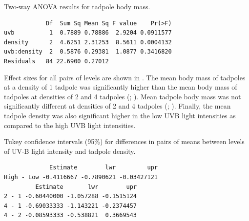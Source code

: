 \documentclass[10pt,openany]{book}\usepackage[]{graphicx}\usepackage[]{color}
\makeatletter
\newenvironment{kframe}{%
 \def\at@end@of@kframe{}%
 \ifinner\ifhmode%
  \def\at@end@of@kframe{\end{minipage}}%
  \begin{minipage}{\columnwidth}%
 \fi\fi%
 \def\FrameCommand##1{\hskip\@totalleftmargin \hskip-\fboxsep
 \colorbox{shadecolor}{##1}\hskip-\fboxsep
     \hskip-\linewidth \hskip-\@totalleftmargin \hskip\columnwidth}%
 \MakeFramed {\advance\hsize-\width
   \@totalleftmargin\z@ \linewidth\hsize
   \@setminipage}}%
 {\par\unskip\endMakeFramed%
 \at@end@of@kframe}
\newenvironment{knitrout}{}{} %
\makeatother
\begin{document}
\begin{table}[h]
  \centering
  \caption{Two-way ANOVA results for tadpole body mass.}\label{tab:TWATadpoleANOVA}
\begin{knitrout}
\color{fgcolor}\begin{kframe}
\begin{verbatim}
            Df  Sum Sq Mean Sq F value    Pr(>F)
uvb          1  0.7889 0.78886  2.9204 0.0911577
density      2  4.6251 2.31253  8.5611 0.0004132
uvb:density  2  0.5876 0.29381  1.0877 0.3416820
Residuals   84 22.6900 0.27012                  
\end{verbatim}
\end{kframe}
\end{knitrout}
\end{table}

Effect sizes for all pairs of levels are shown in .  The mean body mass of tadpoles at a density of 1 tadpole was significantly higher than the mean body mass of tadpoles at densities of 2 and 4 tadpoles (; ).  Mean tadpole body mass was not significantly different at densities of 2 and 4 tadpoles (; ).  Finally, the mean tadpole density was also significant higher in the low UVB light intensities as compared to the high UVB light intensities.

\begin{table}[h]
  \centering
  \caption{Tukey confidence intervals (95\%) for differences in pairs of means between levels of UV-B light intensity and tadpole density.}\label{tab:TWATadpoleTukey}
\begin{knitrout}
\color{fgcolor}\begin{kframe}
\begin{verbatim}
             Estimate        lwr         upr
High - Low -0.4116667 -0.7890621 -0.03427121
         Estimate       lwr        upr
2 - 1 -0.60440000 -1.057288 -0.1515124
4 - 1 -0.69033333 -1.143221 -0.2374457
4 - 2 -0.08593333 -0.538821  0.3669543
\end{verbatim}
\end{kframe}
\end{knitrout}
\end{table}
\end{document}

